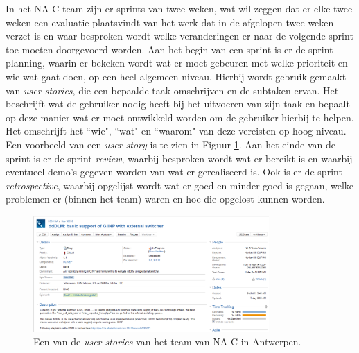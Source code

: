 \documentclass[10pt,a4paper]{article}
\begin{document}
In het NA-C team zijn er sprints van twee weken, wat wil zeggen dat er elke twee weken een evaluatie plaatsvindt van het werk dat in de afgelopen twee weken verzet is en waar besproken wordt welke veranderingen er naar de volgende sprint toe moeten doorgevoerd worden. Aan het begin van een sprint is er de sprint planning, waarin er bekeken wordt wat er moet gebeuren met welke prioriteit en wie wat gaat doen, op een heel algemeen niveau. Hierbij wordt gebruik gemaakt van \textit{user stories}, die een bepaalde taak omschrijven en de subtaken ervan. Het beschrijft wat de gebruiker nodig heeft bij het uitvoeren van zijn taak en bepaalt op deze manier wat er moet ontwikkeld worden om de gebruiker hierbij te helpen. Het omschrijft het ``wie", ``wat" en ``waarom" van deze vereisten op hoog niveau. Een voorbeeld van een \textit{user story} is te zien in Figuur \ref{user_story}. Aan het einde van de sprint is er de sprint \textit{review}, waarbij besproken wordt wat er bereikt is en waarbij eventueel demo's gegeven worden van wat er gerealiseerd is. Ook is er de sprint \textit{retrospective}, waarbij opgelijst wordt wat er goed en minder goed is gegaan, welke problemen er (binnen het team) waren en hoe die opgelost kunnen worden.

\begin{figure}[ht!]
\centering
\includegraphics[width=90mm]{user_story.png}
\caption{Een van de \textit{user stories} van het team van NA-C in Antwerpen.} 
\label{user_story}
\end{figure}
\end{document}
